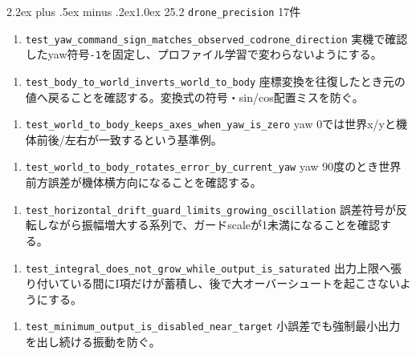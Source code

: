 \documentclass[10pt,a4paper,openany]{ltjsbook}
\makeatletter
\renewcommand\section{\@startsection{section}{1}{0pt}%
  {2.2ex plus .5ex minus .2ex}{1.0ex}%
  {\sffamily\Large\bfseries\color{ReportNavy}}}
\makeatother
\begin{document}
\section{25.2 \texttt{drone\_precision} 17件}
\begin{enumerate}
\item \texttt{test\_yaw\_command\_sign\_matches\_observed\_codrone\_direction}  
実機で確認したyaw符号\texttt{-1}を固定し、プロファイル学習で変わらないようにする。\par
\end{enumerate}
\begin{enumerate}
\item \texttt{test\_body\_to\_world\_inverts\_world\_to\_body}  
座標変換を往復したとき元の値へ戻ることを確認する。変換式の符号・sin/cos配置ミスを防ぐ。\par
\end{enumerate}
\begin{enumerate}
\item \texttt{test\_world\_to\_body\_keeps\_axes\_when\_yaw\_is\_zero}  
yaw 0では世界x/yと機体前後/左右が一致するという基準例。\par
\end{enumerate}
\begin{enumerate}
\item \texttt{test\_world\_to\_body\_rotates\_error\_by\_current\_yaw}  
yaw 90度のとき世界前方誤差が機体横方向になることを確認する。\par
\end{enumerate}
\begin{enumerate}
\item \texttt{test\_horizontal\_drift\_guard\_limits\_growing\_oscillation}  
誤差符号が反転しながら振幅増大する系列で、ガードscaleが1未満になることを確認する。\par
\end{enumerate}
\begin{enumerate}
\item \texttt{test\_integral\_does\_not\_grow\_while\_output\_is\_saturated}  
出力上限へ張り付いている間にI項だけが蓄積し、後で大オーバーシュートを起こさないようにする。\par
\end{enumerate}
\begin{enumerate}
\item \texttt{test\_minimum\_output\_is\_disabled\_near\_target}  
小誤差でも強制最小出力を出し続ける振動を防ぐ。\par
\end{enumerate}
\end{document}
